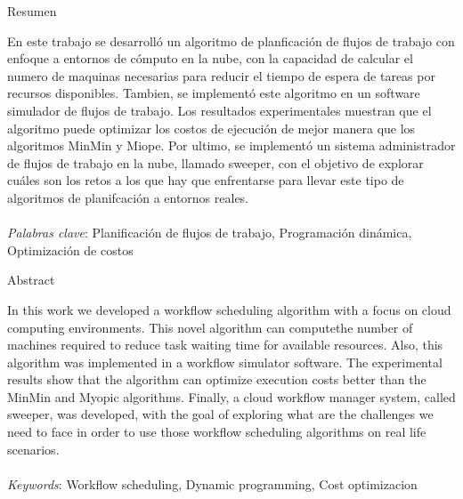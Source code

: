 \begin{center}
Resumen
\end{center}
\noindent En este trabajo se desarroll\'o un algoritmo de planficaci\'on de flujos de trabajo con enfoque a entornos de c\'omputo en la nube, con la capacidad de calcular el numero de maquinas necesarias para reducir el tiempo de espera de tareas por recursos disponibles. Tambien, se implement\'o este algoritmo en un software simulador de flujos de trabajo. Los resultados experimentales muestran que el algoritmo puede optimizar los costos de ejecuci\'on de mejor manera que los algoritmos MinMin y Miope. Por ultimo, se implement\'o un sistema administrador de flujos de trabajo en la nube, llamado sweeper, con el objetivo de explorar cu\'ales son los retos a los que hay que enfrentarse para llevar este tipo de algoritmos de planifcaci\'on a entornos reales.
\\\\
\noindent \emph{Palabras clave}: Planificación de flujos de trabajo, Programaci\'on din\'amica, Optimizaci\'on de costos

\begin{center}
Abstract
\end{center}
\noindent In this work we developed a workflow scheduling algorithm with a focus on cloud computing environments. This novel algorithm can computethe number of machines required to reduce task waiting time for available resources. Also, this algorithm was implemented in a workflow simulator software. The experimental results show that the algorithm can optimize execution costs better than the MinMin and Myopic algorithms. Finally, a cloud workflow manager system, called sweeper, was developed, with the goal of exploring what are the challenges we need to face in order to use those workflow scheduling algorithms on real life scenarios.
\\\\
\noindent \emph{Keywords}: Workflow scheduling, Dynamic programming, Cost optimizacion

\clearpage